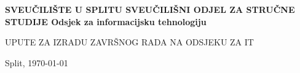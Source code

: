 \begin{titlepage}


\bfseries
\headerdata
{SVEUČILIŠTE U SPLITU}
{SVEUČILIŠNI ODJEL ZA STRUČNE STUDIJE}
{Odsjek za informacijsku tehnologiju}

\vspace*{4cm}
\begin{center}

\vspace*{3cm}

\vspace*{0.5cm}
\Huge UPUTE ZA IZRADU ZAVRŠNOG RADA NA ODSJEKU ZA IT

\end{center}
\begin{center}
\vfill
{\large Split, \today}
\end{center}
\end{titlepage}
